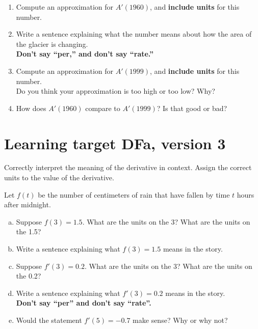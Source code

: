 \begin{enumerate}[leftmargin=0pt]

\item Compute an approximation for $A'(1960)$, and {\bf include units} for this number.
\vfill
\item Write a sentence explaining what the number means about how the area of the glacier is changing.\\
\textbf{Don't say ``per,'' and don't say ``rate.''}

\vfill
\vfill

\item Compute an approximation for $A'(1999)$, and {\bf include units} for this number.\\
Do you think your approximation is too high or too low? Why?

\vfill
\vfill

\item How does $A'(1960)$ compare to $A'(1999)$? Is that good or bad?
\vfill
\end{enumerate}


\pagebreak

\section{Learning target DFa, version 3}

Correctly interpret the meaning of the derivative in context. Assign the correct units to the value of the derivative.

\hrulefill

Let $f(t)$ be the number of centimeters of rain that have fallen by time $t$ hours after midnight.
\begin{enumerate}[(a)]

\item Suppose $f(3) = 1.5$. What are the units on the 3? What are the units on the 1.5?
\vfill
\item Write a sentence explaining what $f(3) = 1.5$ means in the story.
\vfill

\item Suppose $f'(3) = 0.2$. What are the units on the 3? What are the units on the 0.2?
\vfill
\item Write a sentence explaining what $f'(3) = 0.2$ means in the story.\\
\textbf{Don't say ``per'' and don't say ``rate''.}

\vfill
\item Would the statement $f'(5) = -0.7$ make sense?
Why or why not?

\end{enumerate}

